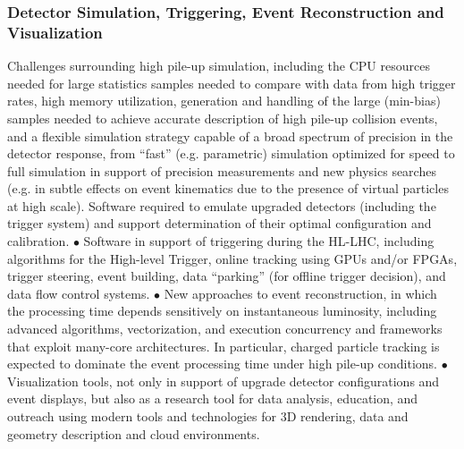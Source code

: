 \begin{frame}
\frametitle{Detector Simulation, Triggering, Event Reconstruction and Visualization} 
\scriptsize{
Challenges surrounding high pile-up simulation,
including the CPU resources needed for large statistics samples
needed to compare with data from high trigger rates, high memory
utilization, generation and handling of the large (min-bias) samples
needed to achieve accurate description of high pile-up collision
events, and a flexible simulation strategy capable of a broad
spectrum of precision in the detector response, from ``fast''
(e.g. parametric) simulation optimized for speed to full simulation
in support of precision measurements and new physics searches
(e.g. in subtle effects on event kinematics due to the presence of
virtual particles at high scale).
Software required to emulate upgraded detectors (including the
trigger system) and support determination of their optimal
configuration and calibration. $\bullet$
Software in support of triggering
during the HL-LHC, including algorithms for the High-level Trigger,
online tracking using GPUs and/or FPGAs, trigger steering, event
building, data ``parking'' (for offline trigger decision), and data
flow control systems. $\bullet$ New approaches to event reconstruction, in
which the processing time depends sensitively on instantaneous
luminosity, including advanced algorithms, vectorization, and
execution concurrency and frameworks that exploit many-core
architectures. In particular, charged particle tracking is expected
to dominate the event processing time under high pile-up
conditions. $\bullet$ Visualization tools, not only in support of upgrade
detector configurations and event displays, but also as a research
tool for data analysis, education, and outreach using modern tools
and technologies for 3D rendering, data and geometry description and
cloud environments.
}
\end{frame}


